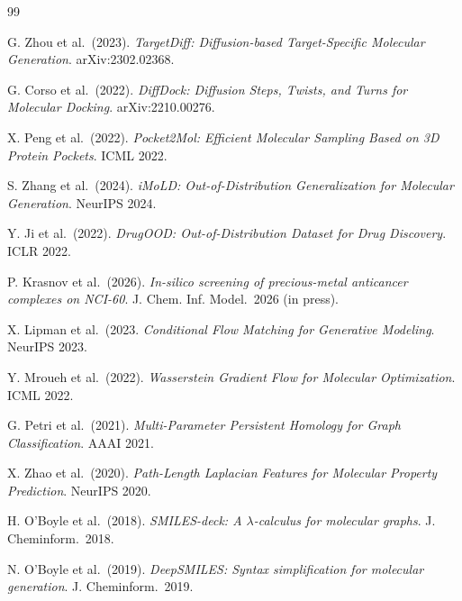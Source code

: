 \documentclass[10pt]{article}
\begin{document}




\begin{thebibliography}{99}

G. Zhou et al.\ (2023).
\textit{TargetDiff: Diffusion-based Target-Specific Molecular Generation}.
arXiv:2302.02368.

G. Corso et al.\ (2022).
\textit{DiffDock: Diffusion Steps, Twists, and Turns for Molecular Docking}.
arXiv:2210.00276.

X. Peng et al.\ (2022).
\textit{Pocket2Mol: Efficient Molecular Sampling Based on 3D Protein Pockets}.
ICML 2022.

S. Zhang et al.\ (2024).
\textit{iMoLD: Out-of-Distribution Generalization for Molecular Generation}.
NeurIPS 2024.

Y. Ji et al.\ (2022).
\textit{DrugOOD: Out-of-Distribution Dataset for Drug Discovery}.
ICLR 2022.

P. Krasnov et al.\ (2026).
\textit{In-silico screening of precious-metal anticancer complexes on NCI-60}.
J. Chem. Inf. Model.\ 2026 (in press).

X. Lipman et al.\ (2023.
\textit{Conditional Flow Matching for Generative Modeling}.
NeurIPS 2023.

Y. Mroueh et al.\ (2022).
\textit{Wasserstein Gradient Flow for Molecular Optimization}.
ICML 2022.

G. Petri et al.\ (2021).
\textit{Multi-Parameter Persistent Homology for Graph Classification}.
AAAI 2021.

X. Zhao et al.\ (2020).
\textit{Path-Length Laplacian Features for Molecular Property Prediction}.
NeurIPS 2020.

H. O'Boyle et al.\ (2018).
\textit{SMILES-deck: A $\lambda$-calculus for molecular graphs}.
J. Cheminform.\ 2018.

N. O'Boyle et al.\ (2019).
\textit{DeepSMILES: Syntax simplification for molecular generation}.
J. Cheminform.\ 2019.

\end{thebibliography}
\end{document}
